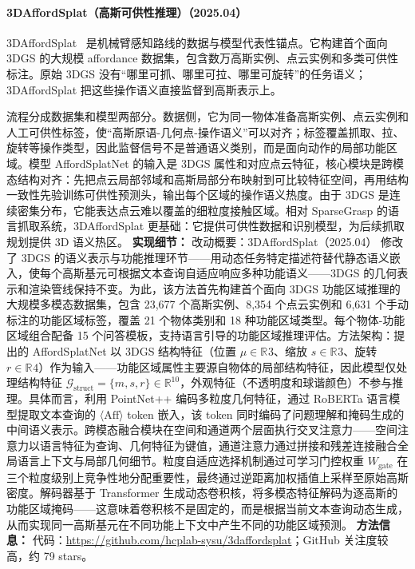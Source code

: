 \paragraph{3DAffordSplat（高斯可供性推理）（2025.04）}
3DAffordSplat~\cite{2504_11218} 是机械臂感知路线的数据与模型代表性锚点。它构建首个面向 3DGS 的大规模 affordance 数据集，包含数万高斯实例、点云实例和多类可供性标注。原始 3DGS 没有“哪里可抓、哪里可拉、哪里可旋转”的任务语义；3DAffordSplat 把这些操作语义直接监督到高斯表示上。

流程分成数据集和模型两部分。数据侧，它为同一物体准备高斯实例、点云实例和人工可供性标签，使“高斯原语-几何点-操作语义”可以对齐；标签覆盖抓取、拉、旋转等操作类型，因此监督信号不是普通语义类别，而是面向动作的局部功能区域。模型 AffordSplatNet 的输入是 3DGS 属性和对应点云特征，核心模块是跨模态结构对齐：先把点云局部邻域和高斯局部分布映射到可比较特征空间，再用结构一致性先验训练可供性预测头，输出每个区域的操作语义热度。由于 3DGS 是连续密集分布，它能表达点云难以覆盖的细粒度接触区域。相对 SparseGrasp 的语言抓取系统，3DAffordSplat 更基础：它提供可供性数据和识别模型，为后续抓取规划提供 3D 语义热区。
\textbf{实现细节：} 改动概要：3DAffordSplat（2025.04） 修改了 3DGS 的语义表示与功能推理环节——用动态任务特定描述符替代静态语义嵌入，使每个高斯基元可根据文本查询自适应响应多种功能语义——3DGS 的几何表示和渲染管线保持不变。为此，该方法首先构建首个面向 3DGS 功能区域推理的大规模多模态数据集，包含 23,677 个高斯实例、8,354 个点云实例和 6,631 个手动标注的功能区域标签，覆盖 21 个物体类别和 18 种功能区域类型。每个物体-功能区域组合配备 15 个问答模板，支持语言引导的功能区域推理评估。方法架构：提出的 AffordSplatNet 以 3DGS 结构特征（位置 $\mu \in \mathbb{R}^{}3$、缩放 $s \in \mathbb{R}^{}3$、旋转 $r \in \mathbb{R}^{}4$）作为输入——功能区域属性主要源自物体的局部结构特征，因此模型仅处理结构特征 $\mathcal{G}_\mathrm{struct} = \{m, s, r\} \in \mathbb{R}^{10}$，外观特征（不透明度和球谐颜色）不参与推理。具体而言，利用 PointNet++ 编码多粒度几何特征，通过 RoBERTa 语言模型提取文本查询的 $\langle\mathrm{Aff}\rangle$ token 嵌入，该 token 同时编码了问题理解和掩码生成的中间语义表示。跨模态融合模块在空间和通道两个层面执行交叉注意力——空间注意力以语言特征为查询、几何特征为键值，通道注意力通过拼接和残差连接融合全局语言上下文与局部几何细节。粒度自适应选择机制通过可学习门控权重 $W_\mathrm{gate}$ 在三个粒度级别上竞争性地分配重要性，最终通过逆距离加权插值上采样至原始高斯密度。解码器基于 Transformer 生成动态卷积核，将多模态特征解码为逐高斯的功能区域掩码——这意味着卷积核不是固定的，而是根据当前文本查询动态生成，从而实现同一高斯基元在不同功能上下文中产生不同的功能区域预测。
\textbf{方法信息：} 代码：\url{https://github.com/hcplab-sysu/3daffordsplat}；GitHub 关注度较高，约 79 stars。



